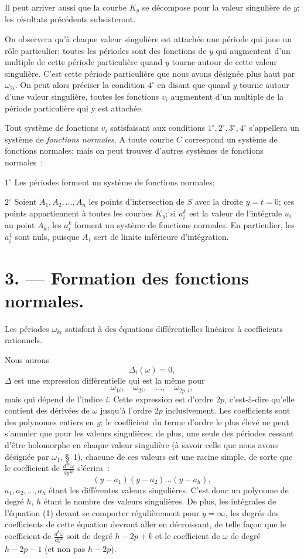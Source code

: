 \documentclass{article}
\begin{document}
Il peut arriver aussi que la courbe $K_{y}$ se décompose pour la valeur singulière de $y$; les résultats précédents subsisteront.

On observera qu'à chaque valeur singulière est attachée une période qui joue un rôle particulier; toutes les périodes sont des fonctions de $y$ qui augmentent d'un multiple de cette période particulière quand $y$ tourne autour de cette valeur singulière. C'est cette période particulière que nous avons désignée plus haut par $\omega_{2i}$. On peut alors préciser la condition $4^{\circ}$ en disant que quand $y$ tourne autour d'une valeur singulière, toutes les fonctions $v_{i}$ augmentent d'un multiple de la période particulière qui y est attachée.

Tout système de fonctions $v_{i}$ satisfaisant aux conditions $1^{\circ}, 2^{\circ}, 3^{\circ}, 4^{\circ}$ s'appellera un système de \emph{fonctions normales}. A toute courbe $C$ correspond un système de fonctions normales; mais on peut trouver d'autres systèmes de fonctions normales~:

$1^{\circ}$ Les périodes forment un système de fonctions normales;

$2^{\circ}$ Soient $A_{1}, A_{2}, \ldots, A_{n}$ les points d'intersection de $S$ avec la droite $y = t = 0$; ces points appartiennent à toutes les courbes $K_{y}$; si $a_{i}^{k}$ est la valeur de l'intégrale $u_{i}$ au point $A_{k}$, les $a_{i}^{k}$ forment un système de fonctions normales. En particulier, les $a_{i}^{1}$ sont nuls, puisque $A_{1}$ sert de limite inférieure d'intégration.
\section*{3. --- Formation des fonctions normales.}

Les périodes $\omega_{ki}$ satisfont à des équations différentielles linéaires à coefficients rationnels.

Nous aurons
\[
\Delta_{i}(\omega) = 0, \tag{1}
\]
$\Delta$ est une expression différentielle qui est la même pour
\[
\omega_{1i}, \quad \omega_{2i}, \quad \ldots, \quad \omega_{2p,i},
\]
mais qui dépend de l'indice $i$. Cette expression est d'ordre $2p$, c'est-à-dire qu'elle contient des dérivées de $\omega$ jusqu'à l'ordre $2p$ inclusivement. Les coefficients sont des polynomes entiers en $y$; le coefficient du terme d'ordre le plus élevé ne peut s'annuler que pour les valeurs singulières; de plus, une seule des périodes cessant d'être holomorphe en chaque valeur singulière (à savoir celle que nous avons désignée par $\omega_{1}$, §~1), chacune de ces valeurs est une racine simple, de sorte que le coefficient de $\frac{d^{2p}\omega}{dy^{2p}}$ s'écrira~:
\[
(y - a_{1})(y - a_{2})\ldots(y - a_{h}),
\]
$a_{1}, a_{2}, \ldots, a_{h}$ étant les différentes valeurs singulières. C'est donc un polynome de degré $h$, $h$ étant le nombre des valeurs singulières. De plus, les intégrales de l'équation (1) devant se comporter régulièrement pour $y = \infty$, les degrés des coefficients de cette équation devront aller en décroissant, de telle façon que le coefficient de $\frac{d^{k}\omega}{dy^{k}}$ soit de degré $h - 2p + k$ et le coefficient de $\omega$ de degré $h - 2p - 1$ (et non pas $h - 2p$).
\end{document}
